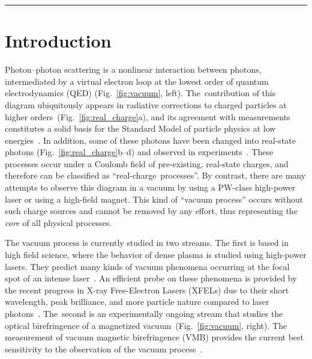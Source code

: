\documentclass[10pt,a4paper]{article}%
\begin{document}
\vspace{8pt}

\hrule

\vspace{12pt}

\section{Introduction}\label{sec:introduction}

Photon--photon scattering is a nonlinear interaction between photons, intermediated by a virtual electron loop at the lowest order of quantum electrodynamics (QED) (Fig.~\ref{fig:vacuum}, left).
The~contribution of this diagram ubiquitously appears in radiative corrections to charged particles at higher orders~(Fig.~\ref{fig:real_charge}a),
and its agreement with measurements constitutes a solid basis for the Standard Model of particle physics at low energies~\cite{g-2_el, g-2_mu, g-2_el_mea}.
In addition, some of these photons have been changed into real-state photons (Fig.~\ref{fig:real_charge}b--d) and observed in experiments~\cite{ps, ds, upc}.
These processes occur under a Coulomb field of pre-existing, real-state charges, and therefore can be classified as ``real-charge~processes''.
By contrast, there are many attempts to observe this diagram in a vacuum by using a PW-class high-power laser or using a high-field magnet.
This kind of ``vacuum process'' occurs without such charge sources and cannot be removed by any effort, thus representing the {\it core} of all physical processes.

The vacuum process is currently studied in two streams.
The first is based in high field science, where the behavior of dense plasma is studied using high-power lasers.
They predict many kinds of vacuum phenomena occurring at the focal spot of an intense laser~\cite{review1, review2}.
An efficient probe on these phenomena is provided by the recent progress in X-ray Free-Electron Lasers (XFELs) due to their short wavelength, peak brilliance, and more particle nature compared to laser photons~\cite{schlenvoigt}.
The~second is an experimentally ongoing stream that studies the optical birefringence of a magnetized vacuum~(Fig.~\ref{fig:vacuum}, right).
The measurement of vacuum magnetic birefringence (VMB) provides the current best sensitivity to the observation of the vacuum process~\cite{pvlas}.
\end{document}

